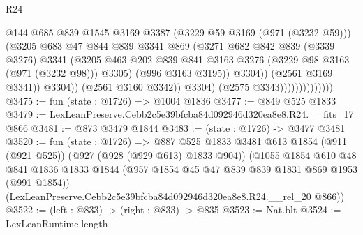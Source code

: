 \begin{lexlean}{R24}
\begin{coremodule}
                                          @144
                                          @685
                                          @839
                                          @1545
                                          @3169
                                          @3387
                                          (@3229 @59 @3169 (@971 (@3232 @59)))
                                          (@3205
                                            @683
                                            @47
                                            @844
                                            @839
                                            @3341
                                            @869
                                            (@3271
                                              @682
                                              @842
                                              @839
                                              (@3339 @3276)
                                              @3341
                                              (@3205
                                                @463
                                                @202
                                                @839
                                                @841
                                                @3163
                                                @3276
                                                (@3229 @98 @3163 (@971 (@3232 @98)))
                                                @3305)
                                              (@996 @3163 @3195))
                                            @3304))
                                        (@2561 @3169 @3341))
                                      @3304))
                                  (@2561 @3160 @3342))
                                @3304)
                              (@2575 @3343))))))))))))))
@3475 := fun (state : @1726) => @1004 @1836
@3477 := @849 @525 @1833
@3479 := LexLeanPreserve.Cebb2c5e39bfcba84d092946d320ea8e8.R24.__fits_17 @866
@3481 := @873 @3479 @1844
@3483 := (state : @1726) -> @3477 @3481
@3520 := fun (state : @1726) =>
  @887
    @525
    @1833
    @3481
    @613
    @1854
    (@911 (@921 @525))
    (@927 (@928 (@929 @613) @1833 @904))
    (@1055
      @1854
      @610
      @48
      @841
      @1836
      @1833
      @1844
      (@957 @1854 @45 @47 @839 @839 @1831 @869 @1953 (@991 @1854))
      (LexLeanPreserve.Cebb2c5e39bfcba84d092946d320ea8e8.R24.__rel_20 @866))
@3522 := (left : @833) -> (right : @833) -> @835
@3523 := Nat.blt
@3524 := LexLeanRuntime.length

\end{coremodule}
\end{lexlean}
